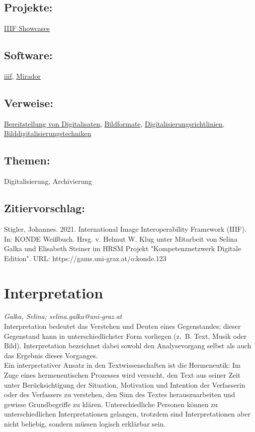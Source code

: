 \documentclass{article}
\begin{document}
        \subsection*{Projekte:}\href{https://showcase.iiif.io/}{IIIF Showcases}\subsection*{Software:}\href{https://iiif.io/}{iiif}, \href{http://projectmirador.org/}{Mirador}\subsection*{Verweise:}\href{https://gams.uni-graz.at/o:konde.36}{Bereitstellung von
                           Digitalisaten}, \href{https://gams.uni-graz.at/o:konde.122}{Bildformate}, \href{https://gams.uni-graz.at/o:konde.63}{Digitalisierungsrichtlinien}, \href{https://gams.uni-graz.at/o:konde.37}{Bilddigitalisierungstechniken}\subsection*{Themen:}Digitalisierung, Archivierung\subsection*{Zitiervorschlag:}Stigler, Johannes. 2021. International Image Interoperability Framework (IIIF). In: KONDE Weißbuch. Hrsg. v. Helmut W. Klug unter Mitarbeit von Selina Galka und Elisabeth Steiner im HRSM Projekt "Kompetenznetzwerk Digitale Edition". URL: https://gams.uni-graz.at/o:konde.123\newpage\section*{Interpretation} \emph{Galka, Selina; selina.galka@uni-graz.at }\\
        
    Interpretation bedeutet das Verstehen und Deuten eines Gegenstandes; dieser Gegenstand kann in unterschiedlichster Form vorliegen (z. B. Text, Musik oder Bild). Interpretation bezeichnet dabei sowohl den Analysevorgang selbst als auch das Ergebnis dieses Vorganges. \\
            
        Ein interpretativer Ansatz in den Textwissenschaften ist die Hermeneutik: Im Zuge eines hermeneutischen Prozesses wird versucht, den Text aus seiner Zeit unter Berücksichtigung der Situation, Motivation und Intention der Verfasserin oder des Verfassers zu verstehen, den Sinn des Textes herauszuarbeiten und gewisse Grundbegriffe zu klären. Unterschiedliche Personen können zu unterschiedlichen Interpretationen gelangen, trotzdem sind Interpretationen aber nicht beliebig, sondern müssen logisch erklärbar sein. \\
            
\end{document}
